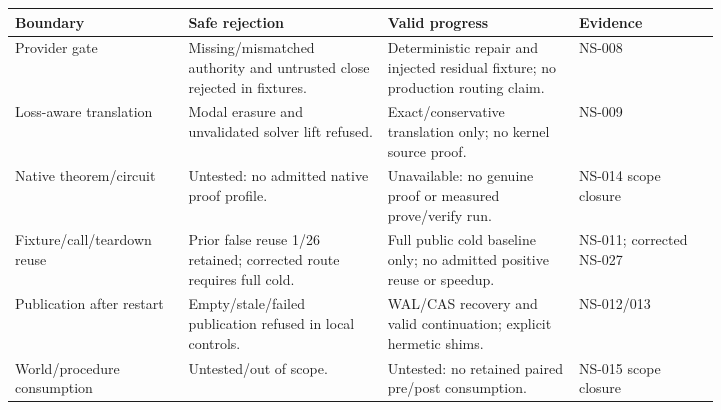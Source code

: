 \begin{tabular}{p{0.18\linewidth}p{0.24\linewidth}p{0.23\linewidth}p{0.17\linewidth}}
\hline
Boundary & Safe rejection & Valid progress & Evidence \\
\hline
Provider gate & Missing/mismatched authority and untrusted close rejected in fixtures. & Deterministic repair and injected residual fixture; no production routing claim. & NS-008 \\
Loss-aware translation & Modal erasure and unvalidated solver lift refused. & Exact/conservative translation only; no kernel source proof. & NS-009 \\
Native theorem/circuit & Untested: no admitted native proof profile. & Unavailable: no genuine proof or measured prove/verify run. & NS-014 scope closure \\
Fixture/call/teardown reuse & Prior false reuse 1/26 retained; corrected route requires full cold. & Full public cold baseline only; no admitted positive reuse or speedup. & NS-011; corrected NS-027 \\
Publication after restart & Empty/stale/failed publication refused in local controls. & WAL/CAS recovery and valid continuation; explicit hermetic shims. & NS-012/013 \\
World/procedure consumption & Untested/out of scope. & Untested: no retained paired pre/post consumption. & NS-015 scope closure \\
\hline
\end{tabular}
